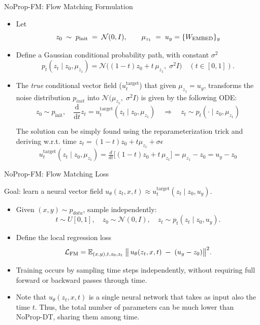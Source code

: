 \documentclass{beamer}
\begin{document}
\begin{frame}{NoProp-FM: Flow Matching Formulation}
  \begin{itemize}
    \item Let
      \[
        z_0 \;\sim\; p_{\rm init} \;=\;\mathcal{N}(0,I), 
        \qquad
        \mu_{z_1} \;=\; u_y = \{W_{\mathrm{EMBED}}\}_y
      \]
    \item Define a Gaussian conditional probability path, with constant $\sigma^2$
      \[
        p_t(z_t \mid z_0, \mu_{z_1})
        = \mathcal{N}\!\bigl((1-t)z_0 + t\,\mu_{z_1},\;\sigma^2 I\bigr)
        \quad (t\in[0,1]).
      \]
    \item The \emph{true} conditional vector field ($u_t^{\mathrm{target}}$) that given $\mu_{z_1} = u_y$, transforms the noise distribution $p_{init}$ into $\mathcal{N}\!\bigl(\mu_{z_1},\;\sigma^2 I\bigr)$ is given by the following ODE:
    \[
    z_0 \sim p_{\mathrm{init}}, 
    \quad
    \frac{\mathrm{d}}{\mathrm{d}t} z_t = u_t^{\mathrm{target}}(z_t \mid z_0, \mu_{z_1})
    \quad\Longrightarrow\quad
    z_t \sim p_t(\cdot \mid z_0, \mu_{z_1})
    \]
    
    The solution can be simply found using the reparameterization trick and deriving w.r.t. time $z_t = (1-t)z_0+t\mu_{z_1} + \sigma \epsilon$ 
      \[
        u_t^{\mathrm{target}}(z_t\mid z_0,\mu_{z_1})
        = \tfrac{d}{dt}\bigl[(1-t)z_0 + t\,\mu_{z_1}\bigr]
        = \mu_{z_1} - z_0 = u_y - z_0
      \]

      

  \end{itemize}
\end{frame}

\begin{frame}{NoProp-FM: Flow Matching Loss}

 Goal: learn a neural vector field \(u_{\theta}(z_t,x, t)\approx u_t^{\mathrm{target}}(z_t\mid z_0,u_y)\).

  \begin{itemize}
    \item Given $(x, y) \sim p_{data}$, sample independently:
      \[
        t\sim U[0,1],\quad
        z_0\sim\mathcal{N}(0,I),\quad
        z_t\sim p_t(z_t\mid z_0,u_y).
      \]
    \item Define the local regression loss
      \[
        \mathcal{L}_{\rm FM}
        = \mathbb{E}_{(x, y), t,z_0,z_t}\;
          \bigl\|\,u_{\theta}(z_t,x, t)\;-\;(u_y - z_0)\bigr\|^2.
      \]
    \item Training occurs by sampling time steps independently, without
 requiring full forward or backward passes through time.

    \item Note that $u_{\theta}(z_t,x, t)$ is a single neural network that takes as input also the time $t$. Thus, the total number of parameters can be much lower than NoProp-DT, sharing them among time.
 
  \end{itemize}
\end{frame}
\end{document}
